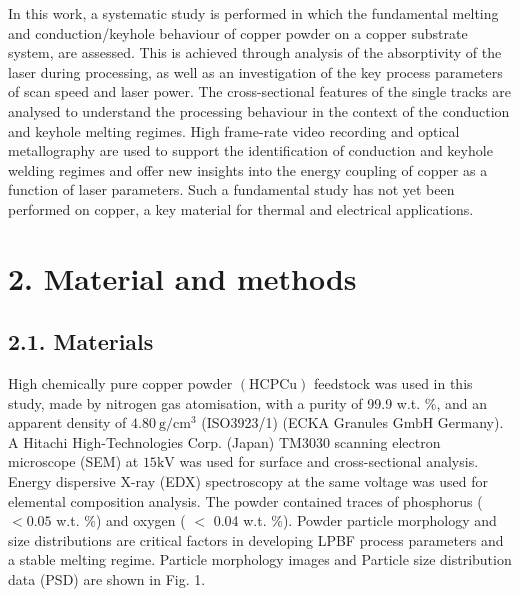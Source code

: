 \documentclass[10pt]{article}
\begin{document}
In this work, a systematic study is performed in which the fundamental melting and conduction/keyhole behaviour of copper powder on a copper substrate system, are assessed. This is achieved through analysis of the absorptivity of the laser during processing, as well as an investigation of the key process parameters of scan speed and laser power. The cross-sectional features of the single tracks are analysed to understand the processing behaviour in the context of the conduction and keyhole melting regimes. High frame-rate video recording and optical metallography are used to support the identification of conduction and keyhole welding regimes and offer new insights into the energy coupling of copper as a function of laser parameters. Such a fundamental study has not yet been performed on copper, a key material for thermal and electrical applications.

\section*{2. Material and methods}
\subsection*{2.1. Materials}
High chemically pure copper powder $(\mathrm{HCP} \mathrm{Cu})$ feedstock was used in this study, made by nitrogen gas atomisation, with a purity of 99.9 w.t. $\%$, and an apparent density of $4.80 \mathrm{~g} / \mathrm{cm}^{3}$ (ISO3923/1) (ECKA Granules GmbH Germany). A Hitachi High-Technologies Corp. (Japan) TM3030 scanning electron microscope (SEM) at $15 \mathrm{kV}$ was used for surface and cross-sectional analysis. Energy dispersive X-ray (EDX) spectroscopy at the same voltage was used for elemental composition analysis. The powder contained traces of phosphorus ( $<0.05$ w.t. \%) and oxygen ( $<$ 0.04 w.t. \%). Powder particle morphology and size distributions are critical factors in developing LPBF process parameters and a stable melting regime. Particle morphology images and Particle size distribution data (PSD) are shown in Fig. 1.
\end{document}
